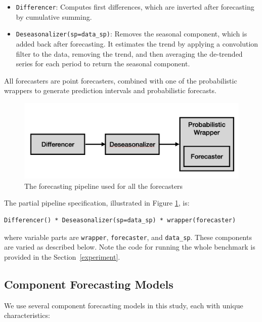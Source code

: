 \begin{itemize}
    \item \texttt{Differencer}: Computes first differences, which are inverted after forecasting by cumulative summing.
    \item \texttt{Deseasonalizer(sp=data\_sp)}: Removes the seasonal component, which is added back after forecasting. It estimates the trend by applying a convolution filter to the data, removing the trend, and then averaging the de-trended series for each period to return the seasonal component.
\end{itemize}

All forecasters are point forecasters, combined with one of the probabilistic wrappers to generate prediction intervals and probabilistic forecasts.

\begin{figure}
    \centering
    \includegraphics[width=\textwidth]{Figures/Pipeline.png}
    \caption{The forecasting pipeline used for all the forecasters}
    \label{fig:pipeline}
\end{figure}

The partial pipeline specification, illustrated in Figure \ref{fig:pipeline}, is:

\begin{verbatim}
Differencer() * Deseasonalizer(sp=data_sp) * wrapper(forecaster)
\end{verbatim}

where variable parts are \texttt{wrapper}, \texttt{forecaster}, and \texttt{data\_sp}. These components are varied as described below.
Note the code for running the whole benchmark is provided in the Section~\ref{experiment}.

\subsection{Component Forecasting Models}

We use several component forecasting models in this study, each with unique characteristics:

